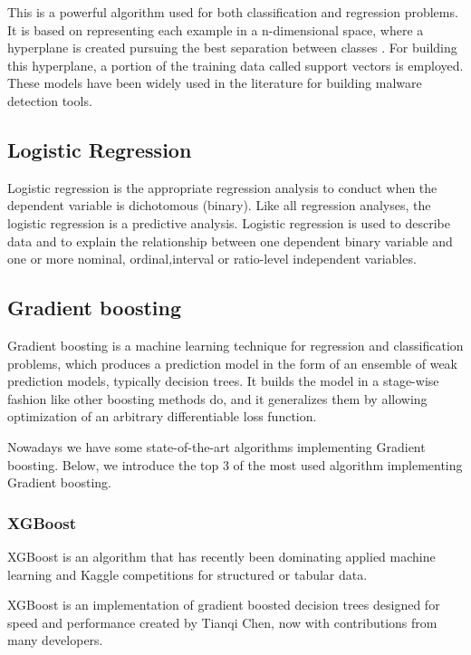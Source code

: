 This is a powerful algorithm used for both classification and regression problems. It is based on
representing each example in a n-dimensional space, where a hyperplane is created pursuing the
best separation between classes \cite{svm}. For building this hyperplane, a portion of the training
data called support vectors is employed. These models have been widely used in the literature
for building malware detection tools.

\subsection{Logistic Regression}

Logistic regression is the appropriate regression analysis to conduct when the dependent variable is dichotomous (binary). \cite{logic} Like all regression analyses, the logistic regression is a predictive analysis.  Logistic regression is used to describe data and to explain the relationship between one dependent binary variable and one or more nominal, ordinal,interval or ratio-level independent variables.

\subsection{Gradient boosting}
Gradient boosting is a machine learning technique for regression and classification problems, which produces a prediction model in the form of an ensemble of weak prediction models, typically decision trees. It builds the model in a stage-wise fashion like other boosting methods do, and it generalizes them by allowing optimization of an arbitrary differentiable loss function.

Nowadays we have some state-of-the-art algorithms implementing Gradient boosting.
Below, we introduce the top 3 of the most used algorithm implementing Gradient boosting.

\subsubsection{XGBoost}

XGBoost is an algorithm that has recently been dominating applied machine learning and Kaggle competitions for structured or tabular data.

XGBoost is an implementation of gradient boosted decision trees designed for speed and performance created by Tianqi Chen, now with contributions from many developers. \cite{xgboost}

